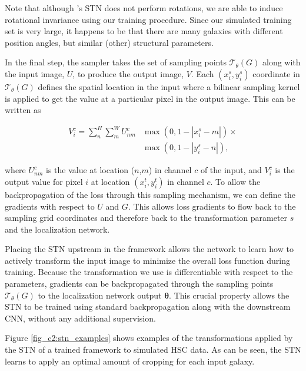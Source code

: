 Note that although \gampen{}'s STN does not perform rotations, we are able to induce rotational invariance using our training procedure.  Since our simulated training set is very large, it happens to be that there are many galaxies with different position angles, but similar (other) structural parameters.

In the final step, the sampler takes the set of sampling points $\mathcal{T}_\theta(G)$ along with the input image, $U$, to produce the output image, $V$. Each $ \left(x_i^s,y_i^s\right)$ coordinate in $\mathcal{T}_\theta(G)$ defines the spatial location in the input where a bilinear sampling kernel is applied to get the value at a particular pixel in the output image. This can be written as 

\begin{equation}
\begin{split}
V_{i}^{c}=\sum_{n}^{H} \sum_{m}^{W} U_{n m}^{c} & \max \left(0,1-\left|x_{i}^{s}-m\right|\right) \times \\ & \max \left(0,1-\left|y_{i}^{s}-n\right|\right) , 
\end{split}
\label{eq:smapling_v}
\end{equation}

\noindent
where $U_{n m}^{c}$ is the value at location ($n$,$m$) in channel $c$ of the input, and $V_{i}^{c}$ is the output value for pixel $i$ at location $\left(x_i^t,y_i^t\right)$ in channel $c$. To allow the backpropagation of the loss through this sampling mechanism, we can define the gradients with respect to $U$ and $G$. This allows loss gradients to flow back to the sampling grid coordinates and therefore back to the transformation parameter $s$ and the localization network.

Placing the STN upstream in the \gampen{} framework allows the network to learn how to actively transform the input image to minimize the overall loss function during training. Because the transformation we use is differentiable with respect to the parameters, gradients can be backpropagated through the sampling points $\mathcal{T}_\theta(G)$ to the localization network output $\boldsymbol{\theta}$. This crucial property allows the STN to be trained using standard backpropagation along with the downstream CNN, without any additional supervision. 

Figure \ref{fig_c2:stn_examples} shows examples of the transformations applied by the STN of a trained \gampen{} framework to simulated HSC data. As can be seen, the STN learns to apply an optimal amount of cropping for each input galaxy. 

